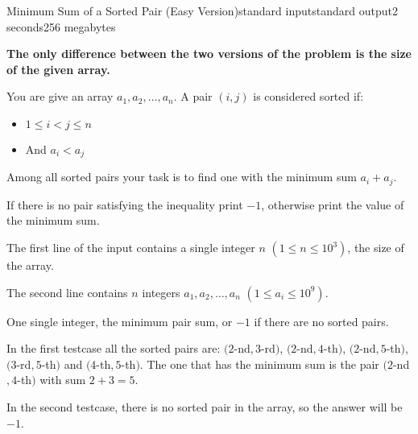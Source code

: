 \begin{problem}{Minimum Sum of a Sorted Pair (Easy Version)}{standard input}{standard output}{2 seconds}{256 megabytes}

\textbf{The only difference between the two versions of the problem is the size of the given array.}

You are give an array $a_1, a_2, \dots, a_n$. A pair $(i,j)$ is considered sorted if:

\begin{itemize}
  \item $1 \leq i < j \leq n$
  \item And $a_i < a_j$
\end{itemize}

Among all sorted pairs your task is to find one with the minimum sum $a_i + a_j$.

If there is no pair satisfying the inequality print $-1$, otherwise print the value of the minimum sum.

\InputFile
The first line of the input contains a single integer $n$ $(1 \leq n \leq 10^3)$, the size of the array.

The second line contains $n$ integers $a_1, a_2, \dots, a_n$ $(1\leq a_i \leq 10^9)$.

\OutputFile
One single integer, the minimum pair sum, or $-1$ if there are no sorted pairs.

\Examples

\begin{example}
%
%
\end{example}

\Note
In the first testcase all the sorted pairs are: $(2$-nd$,3$-rd$)$, $(2$-nd$,4$-th$)$, $(2$-nd$,5$-th$)$, $(3$-rd$,5$-th$)$ and $(4$-th$,5$-th$)$. The one that has the minimum sum is the pair $(2$-nd$,4$-th$)$ with sum $2+3=5$.

In the second testcase, there is no sorted pair in the array, so the answer will be $-1$.



\end{problem}

